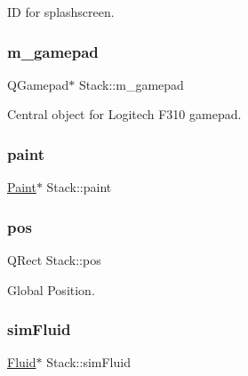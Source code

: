 ID for splashscreen. 

\mbox{\label{classStack_a63dddeeffcc3340219b93b716f9b8bc9}} 
\subsubsection{\texorpdfstring{m\_gamepad}{m\_gamepad}}
{\footnotesize\ttfamily Q\+Gamepad$\ast$ Stack\+::m\+\_\+gamepad}



Central object for Logitech F310 gamepad. 

\mbox{\label{classStack_ae20446c30ae36243a42983dcdc371258}} 
\subsubsection{\texorpdfstring{paint}{paint}}
{\footnotesize\ttfamily \mbox{\hyperlink{classPaint}{Paint}}$\ast$ Stack\+::paint\hspace{0.3cm}{\ttfamily [private]}}

\mbox{\label{classStack_a89c03088e1dd8cf4eb333638b059d30a}} 
\subsubsection{\texorpdfstring{pos}{pos}}
{\footnotesize\ttfamily Q\+Rect Stack\+::pos\hspace{0.3cm}{\ttfamily [private]}}



Global Position. 

\mbox{\label{classStack_a528378e89155254d8245e44892e93bd7}} 
\subsubsection{\texorpdfstring{simFluid}{simFluid}}
{\footnotesize\ttfamily \mbox{\hyperlink{classFluid}{Fluid}}$\ast$ Stack\+::sim\+Fluid\hspace{0.3cm}{\ttfamily [private]}}



